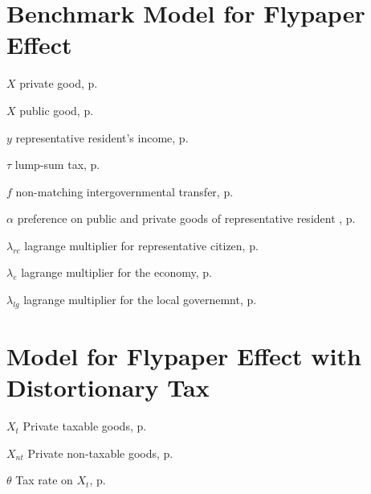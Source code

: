 \begin{eqlist}
    \section*{Benchmark Model for Flypaper Effect}

    \item[$X$]
    private good, p.~\pageref{G}

    \item[$X$]
    public good, p.~\pageref{X}

    \item[$y$]
    representative resident's income, p.~\pageref{y}

    \item[$\tau$]
    lump-sum tax, p.~\pageref{y}

    \item[$f$]
    non-matching intergovernmental transfer, p.~\pageref{f}

    \item[$\alpha$]
    preference on public and private goods of representative resident , p.~\pageref{bmrcutility}

    \item[$\lambda_{rc}$]
    lagrange multiplier for representative citizen, p.~\pageref{bmrclagrangian}

    \item[$\lambda_{e}$]
    lagrange multiplier for the economy, p.~\pageref{bmeclagrangian}

    \item[$\lambda_{lg}$]
    lagrange multiplier for the local governemnt, p.~\pageref{bmeclagrangian}



    \section*{ Model for Flypaper Effect with Distortionary Tax}
    \item[$X_{t}$]
    Private taxable goods, p.~\pageref{Xt}

    \item[$X_{nt}$]
    Private non-taxable goods, p.~\pageref{Xt}

    \item[$\theta$]
    Tax rate on $X_t$, p.~\pageref{Xt}






\end{eqlist}